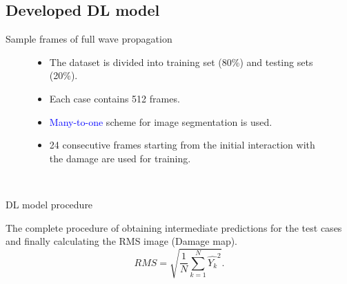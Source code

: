 \documentclass[10pt,aspectratio=169]{beamer} %
\begin{document}
\subsection{Developed DL model}
\setcounter{subfigure}{0}
\begin{frame}{Sample frames of full wave propagation}
	\begin{figure}
		\begin{minipage}[l]{0.3\textwidth}
			\normalsize
			\begin{itemize}[<alert@+>]
				\item The dataset is divided into training set (80\%) and testing sets (20\%).
				\item Each case contains 512 frames.
				\item \textcolor{blue}{Many-to-one} scheme for image segmentation is used.
				\item 24 consecutive frames starting from the initial interaction with the damage are used for training.
			\end{itemize}
		\end{minipage}
		\begin{minipage}[l]{0.65\textwidth}
			\centering	
			 \\	
			\qquad
			\qquad
		\end{minipage}
	\end{figure}
\end{frame}
\setcounter{subfigure}{0}
\begin{frame}{DL model procedure}
	\begin{minipage}[l]{0.35\textwidth}
		The complete procedure of obtaining intermediate predictions for
		the test cases and finally calculating the RMS image (Damage map). \\
		\begin{equation*}
			RMS = \sqrt{\frac{1}{N}\sum_{k=1}^{N}\hat{Y_k}^2}.	
			\label{RMS}
		\end{equation*}
	\end{minipage}
	\begin{minipage}[l]{0.6\textwidth}
		\begin{figure}
			\centering
			\qquad
		\end{figure}
	\end{minipage}	
\end{frame}
\end{document}
